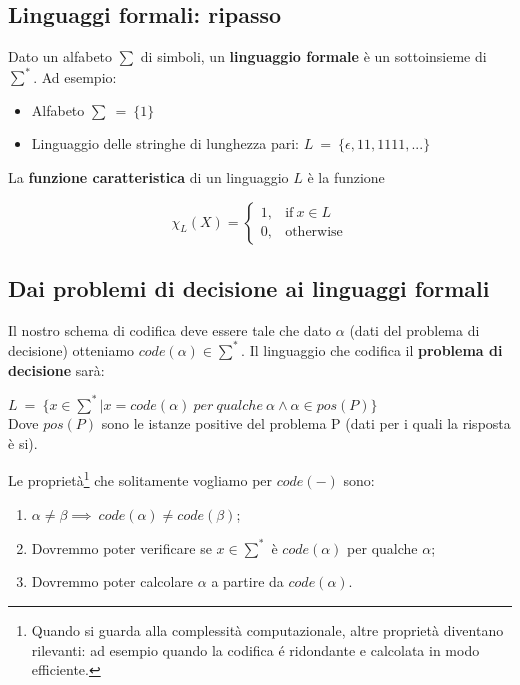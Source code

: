 \documentclass[a4paper, 12pt]{article}
\begin{document}
\subsection{Linguaggi formali: ripasso}
Dato un alfabeto $\sum$ di simboli, un \textbf{linguaggio formale} \`e un sottoinsieme di $\sum^{*}$. Ad esempio:
\begin{itemize}
\item Alfabeto $\sum\ =\ \{1\}$
\item Linguaggio delle stringhe di lunghezza pari: $L\ =\ \{\epsilon, 11,1111,...\}$
\end{itemize}
La \textbf{funzione caratteristica} di un linguaggio $L$ \`e la funzione \begin{center}
\begin{equation}
\chi_{L}(X) =
	\begin{cases}
		1, & \text{if}\ x \in L \\
      	0, & \text{otherwise}
	\end{cases}
\end{equation}
\end{center}
\subsection{Dai problemi di decisione ai linguaggi formali}
Il nostro schema di codifica deve essere tale che dato $\alpha$ (dati del problema di decisione) otteniamo $code(\alpha) \in \sum^{*}$. Il linguaggio che codifica il \textbf{problema di decisione} sar\`a:
\begin{center}
$L\ =\ \{x \in \sum^{*} | x=code(\alpha)\ per\ qualche\  \alpha \land \alpha \in pos(P) \}$\\
Dove $pos(P)$ sono le istanze positive del problema P (dati per i quali la risposta \`e si).
\end{center}
Le propriet\`a\footnote{Quando si guarda alla complessità computazionale, altre proprietà
diventano rilevanti: ad esempio quando la codifica é ridondante e calcolata
in modo efficiente.} che solitamente vogliamo per $code(-)$ sono:
\begin{enumerate}
\item $\alpha \neq \beta \implies\ code(\alpha) \neq code(\beta) $;
\item Dovremmo poter verificare se $x \in \sum^{*}$ \`e $code(\alpha)$ per qualche $\alpha$;
\item Dovremmo poter calcolare $\alpha$ a partire da $code(\alpha)$.
\end{enumerate}
\end{document}
